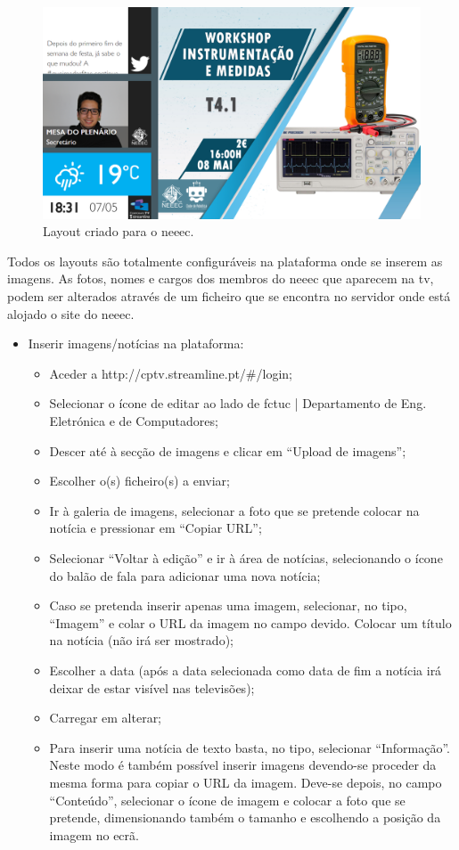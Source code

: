 \begin{figure}[ht]
\centering
\includegraphics[width=\textwidth]{imagens/tvDEEC2.png}
\caption{Layout criado para o \acrshort{neeec}.}
\label{fig:tvDEEC2}
\end{figure}

Todos os layouts são totalmente configuráveis na plataforma onde se inserem as imagens. As fotos, nomes e cargos dos membros do \acrshort{neeec} que aparecem na tv, podem ser alterados através de um ficheiro que se encontra no servidor onde está alojado o site do \acrshort{neeec}.

\begin{itemize}
\item Inserir imagens/notícias na plataforma:
	\begin{itemize}
	\item Aceder a http://cptv.streamline.pt/\#/login;
    \item Selecionar o ícone de editar ao lado de \acrshort{fctuc} | Departamento de Eng. Eletrónica e de Computadores;
    \item Descer até à secção de imagens e clicar em “Upload de imagens”;
    \item Escolher o(s) ficheiro(s) a enviar;
    \item Ir à galeria de imagens, selecionar a foto que se pretende colocar na notícia e pressionar em “Copiar URL”;
    \item Selecionar “Voltar à edição” e ir à área de notícias, selecionando o ícone do balão de fala para adicionar uma nova notícia;
    \item Caso se pretenda inserir apenas uma imagem, selecionar, no tipo, “Imagem” e colar o URL da imagem no campo devido. Colocar um título na notícia (não irá ser mostrado);
    \item Escolher a data (após a data selecionada como data de fim a notícia irá deixar de estar visível nas televisões);
    \item Carregar em alterar;
    \item Para inserir uma notícia de texto basta, no tipo, selecionar “Informação”. Neste modo é também possível inserir imagens devendo-se proceder da mesma forma para copiar o URL da imagem. Deve-se depois, no campo “Conteúdo”, selecionar o ícone de imagem e colocar a foto que se pretende, dimensionando também o tamanho e escolhendo a posição da imagem no ecrã.
	\end{itemize}
\end{itemize}

